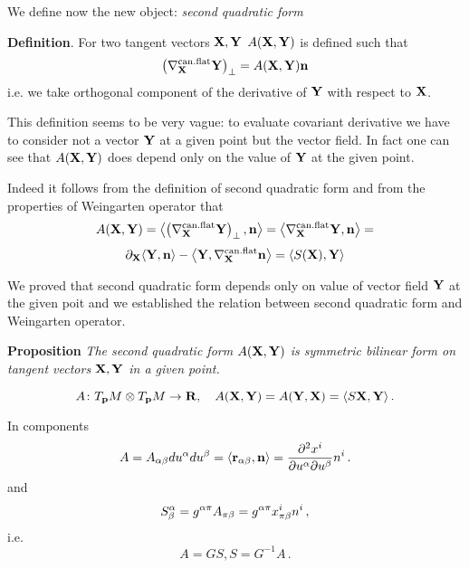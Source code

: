 \documentclass[12pt]{article}
\theoremstyle{theorem}
\numberwithin{equation}{section}
\begin{document}
{We define now the new object: {\it second quadratic form}

{\bf Definition}. For two tangent vectors ${\bf X}, {\bf Y}$
$A({\bf X},{\bf Y})$ is defined such that
\begin{equation}\label{secondquadraticform1}
    \left(\nabla^{\rm can.flat}_{\bf X} {\bf Y}\right)_\bot=A({\bf X},{\bf Y}){\bf n}
\end{equation}
i.e. we take orthogonal component of the derivative of ${\bf Y}$ with respect to ${\bf X}$.

This definition seems to be very vague: to evaluate covariant derivative we have to consider not a
vector ${\bf Y}$ at a given point
but  the vector field.
In fact one can see that  $A({\bf X},{\bf Y})$ does depend only on the value of ${\bf Y}$ at the given point.

Indeed it follows from the definition of second quadratic form and from the properties of Weingarten operator that
        $$
         A({\bf X},{\bf Y})=\left\langle\left(\nabla^{\rm can.flat}_{\bf X} {\bf Y}\right)_\bot,{\bf n}\right\rangle=
    \left\langle\nabla^{\rm can.flat}_{\bf X} {\bf Y},{\bf n}\right\rangle=
        $$
\begin{equation}\label{properofsecquadrform4}
    \partial_{\bf X} \langle{\bf Y},{\bf n}\rangle-\left\langle {\bf Y},\nabla^{\rm can.flat}_{\bf X}{\bf n}\right\rangle=\langle S({\bf X}), {\bf Y}\rangle
\end{equation}



We proved that second quadratic form depends only on value of vector field ${\bf Y}$ at the given poit and we established
the relation between second quadratic form and Weingarten operator.

\m

{\bf Proposition} {\it The second quadratic form $A({\bf X},{\bf Y})$ is symmetric bilinear form on tangent vectors ${\bf X},{\bf Y}$
in a given point.}

       \begin{equation}\label{symmetricityofsecquadrform}
A\colon T_{\bf p} M\otimes T_{\bf p} M\to {\bf R},\quad A({\bf X},{\bf Y})=A({\bf Y},{\bf X})=\langle S{\bf X},{\bf Y}\rangle\,.
       \end{equation}

 In components
 \begin{equation}\label{compexpressforscquadrform}
    A=A_{\alpha\beta}du^\alpha du^\beta=\langle {\bf r}_{\alpha\beta}, {\bf n}\rangle={\partial^2 x^i\over \partial u^\alpha \partial u^\beta}n^i\,.
 \end{equation}
and
\begin{equation}\label{compexpressforweingarten}
    S^\alpha_\beta=g^{\alpha\pi}A_{\pi\beta}=g^{\alpha\pi}x^i_{\pi\beta}n^i\,,
     \end{equation}
i.e.
            $$
         A=GS, S=G^{-1}A\,.
            $$

}
\end{document}
